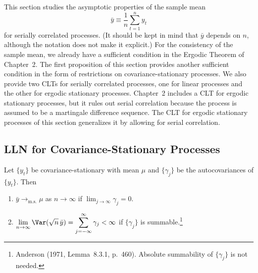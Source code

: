 
This section studies the asymptotic properties of the sample mean
\[
  \bar{y} \equiv \frac{1}{n} \sum_{t=1}^{n} y_t
\]
for serially correlated processes. (It should be kept in mind that $\bar{y}$ depends on
$n$, although the notation does not make it explicit.) For the consistency of the
sample mean, we already have a sufficient condition in the Ergodic Theorem of
Chapter~2. The first proposition of this section provides another sufficient condition
in the form of restrictions on covariance-stationary processes. We also provide
two CLTs for serially correlated processes, one for linear processes and the other
for ergodic stationary processes. Chapter~2 includes a CLT for ergodic stationary
processes, but it rules out serial correlation because the process is assumed to be a
martingale difference sequence. The CLT for ergodic stationary processes of this
section generalizes it by allowing for serial correlation.

\subsection*{LLN for Covariance-Stationary Processes}

\begin{proposition}
\label{prop:6.8}
Let $\{y_t\}$ be covariance-stationary with mean $\mu$ and $\{\gamma_j\}$ be the autocovariances
of $\{y_t\}$. Then
\begin{enumerate}[label=(\alph*)]
\item $\bar{y} \to_{\mathrm{m.s.}} \mu$ as $n \to \infty$ if $\lim_{j \to \infty} \gamma_j = 0$.

\item $\displaystyle \lim_{n \to \infty} \Var(\sqrt{n}\,\bar{y})
  = \sum_{j=-\infty}^{\infty} \gamma_j < \infty$ \quad
  if $\{\gamma_j\}$ is summable.\footnote{Anderson (1971, Lemma~8.3.1, p.~460). Absolute summability of $\{\gamma_j\}$ is not needed.}
\end{enumerate}
\end{proposition}

